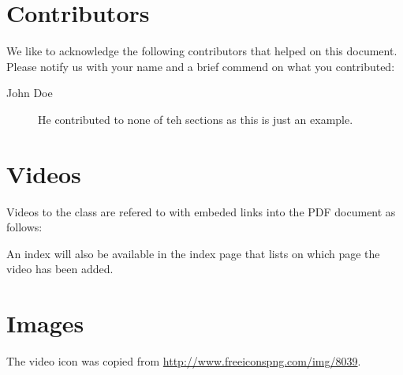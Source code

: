 \section{Contributors}

We like to acknowledge the following contributors that helped on this
document. Please notify us with your name and a brief commend on what
you contributed:

\begin{description}
\item[John Doe] He contributed to none of teh sections as this is just
  an example.
\end{description}


\section{Videos}

Videos to the class are refered to with embeded links into the PDF
document as follows: 


An index will also be available in the index page
that lists on which page the video has been added.

\section{Images}

The video icon was copied from \url{http://www.freeiconspng.com/img/8039}.

